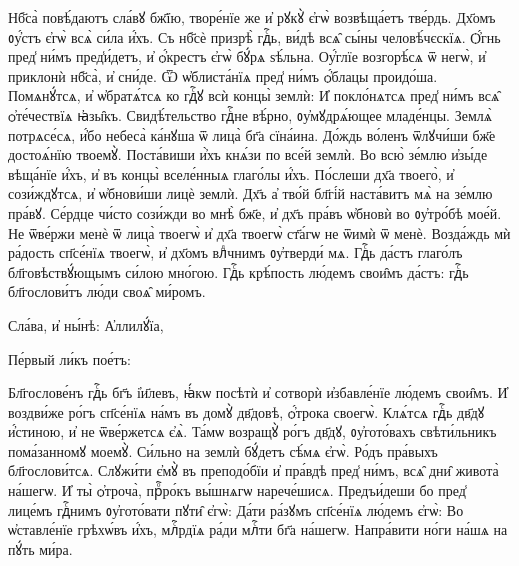 \cuLettrine
Нб҃са̀ повѣ́даютъ сла́вꙋ бж҃їю, творе́нїе же и҆ рꙋкꙋ̀  є҆гѡ̀ возвѣща́етъ тве́рдь. 
\hKv Дх҃омъ ᲂу҆́стъ є҆гѡ̀  всѧ̀ си́ла и҆́хъ. 
\hKv Съ нб҃сѐ призрѣ̀ гдⷭ҇ь, ви́дѣ всѧ̑  сы́ны человѣ́чєскїѧ. 
\hKv Ѻ҆́гнь пред̾ ни́мъ  пред̾и́детъ, и҆ ѻ҆́крестъ є҆гѡ̀ бꙋ́рѧ ѕѣ́льна. 
\hKv  Оу҆́глїе возгорѣ́сѧ ѿ негѡ̀, и҆ приклонѝ нб҃са̀, и҆  сни́де. 
\hKv Ѿ ѡ҆блиста́нїѧ пред̾ ни́мъ ѻ҆́блацы  проидо́ша. 
\hKv Помѧнꙋ́тсѧ, и҆  ѡ҆братѧ́тсѧ ко гдⷭ҇ꙋ всѝ концы̀ землѝ: 
\hKv И҆  покло́нѧтсѧ пред̾ ни́мъ всѧ̑ ѻ҆те́чествїѧ ꙗ҆зы̑къ. 
\hKv  Свидѣ́тельство гдⷭ҇не вѣ́рно, ᲂу҆мꙋдрѧ́ющее младе́нцы.  
\hKv Землѧ̀ потрѧсе́сѧ, и҆́бо небеса̀ ка́нꙋша ѿ лица̀ бг҃а  сїна́ина. 
\hKv До́ждь во́ленъ ѿлꙋчи́ши бж҃е достоѧ́нїю  твоемꙋ̀. 
\hKv Поста́виши и҆̀хъ кнѧ́зи по все́й землѝ. 
\hKv  Во всю̀ зе́млю и҆зы́де вѣща́нїе и҆́хъ, и҆ въ концы̀  вселе́нныѧ глаго́лы и҆́хъ. 
\hKv По́слеши дх҃а твоего̀, и҆  сози́ждꙋтсѧ, и҆ ѡ҆бнови́ши лицѐ землѝ. 
\hKv Дх҃ъ а҆ тво́й  бл҃гі́й наста́витъ мѧ̀ на зе́млю пра́вꙋ. 
\hKv Се́рдце чи́сто  сози́жди во мнѣ̀ бж҃е, и҆ дх҃ъ пра́въ ѡ҆бновѝ во  ᲂу҆тро́бѣ мое́й. 
\hKv Не ѿве́ржи менѐ ѿ лица̀ твоегѡ̀  и҆ дх҃а твоегѡ̀ ст҃а́гѡ не ѿимѝ ѿ менѐ. 
\hKv Возда́ждь  мѝ ра́дость сп҃се́нїѧ твоегѡ̀, и҆ дх҃омъ влⷣчнимъ  ᲂу҆тверди́ мѧ. 
\hKv Гдⷭ҇ь да́стъ глаго́лъ  бл҃говѣствꙋ́ющымъ си́лою мно́гою. 
\hKv Гдⷭ҇ь крѣ́пость  лю́демъ свои̑мъ да́стъ: гдⷭ҇ь бл҃гослови́тъ лю́ди своѧ̑  ми́ромъ. 

\hKv Сла́ва, и҆ ны́нѣ: А҆ллилꙋ́їа,   

%
Пе́рвый ли́къ пое́тъ: 



Бл҃гослове́нъ гдⷭ҇ь бг҃ъ і҆и҃левъ, ꙗ҆́кѡ посѣтѝ и҆  сотворѝ и҆збавле́нїе лю́демъ свои̑мъ. 
\hKv И҆ воздви́же  ро́гъ сп҃се́нїѧ на́мъ въ домꙋ̀ дв҃довѣ, ѻ҆́трока своегѡ̀.  
\hKv Клѧ́тсѧ гдⷭ҇ь дв҃дꙋ и҆́стиною, и҆ не ѿве́ржетсѧ  є҆ѧ̀. 
\hKv Та́мѡ возращꙋ̀ ро́гъ дв҃дꙋ, ᲂу҆гото́вахъ  свѣти́льникъ пома́занномꙋ моемꙋ̀. 
\hKv Си́льно на землѝ  бꙋ́детъ сѣ́мѧ є҆гѡ̀. 
\hKv Ро́дъ пра́выхъ бл҃гослови́тсѧ.  
\hKv Слꙋжи́ти є҆мꙋ̀ въ преподо́бїи и҆ пра́вдѣ пред̾  ни́мъ, всѧ̑ дни̑ живота̀ на́шегѡ. 
\hKv И҆ ты̀ ѻ҆троча̀,  прⷪ҇ро́къ вы́шнѧгѡ нарече́шисѧ. 
\hKv Предъи́деши бо пред̾  лице́мъ гдⷭ҇нимъ ᲂу҆гото́вати пꙋти̑ є҆гѡ̀: 
\hKv Да́ти  ра́зꙋмъ сп҃се́нїѧ лю́демъ є҆гѡ̀: 
\hKv Во ѡ҆ставле́нїе  грѣхѡ́въ и҆́хъ, млⷭ҇рдїѧ ра́ди  млⷭ҇ти бг҃а на́шегѡ. 
\hKv Напра́вити но́ги на́шѧ на пꙋ́ть  ми́ра.  

